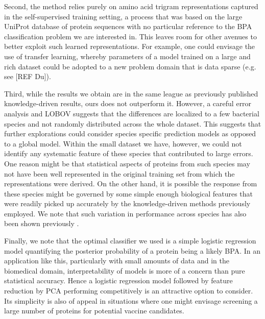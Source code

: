 \documentclass[10pt,journal,compsoc,twoside]{IEEEtran}
\begin{document}
Second, the method relies purely on amino acid trigram representations captured in the self-supervised training setting, a process that was based on the large UniProt database of protein sequences \cite{uniprot_2018} with no particular reference to the BPA classification problem we are interested in. This leaves room for other avenues to better exploit such learned representations. For example, one could envisage the use of transfer learning, whereby parameters of a model trained on a large and rich dataset could be adopted to a new problem domain that is data sparse (e.g. see [REF Du]). 

Third, while the results we obtain are in the same league as previously published knowledge-driven results, ours does not outperform it. However, a careful error analysis and LOBOV suggests that the differences are localized to a few bacterial species and not randomly distributed across the whole dataset. This suggests that further explorations could consider species specific prediction models as opposed to a global model. Within the small dataset we have, however, we could not identify any systematic feature of these species that contributed to large errors. One reason might be that statistical aspects of proteins from such species may not have been well represented in the original training set from which the representations were derived. On the other hand, it is possible the response from these species might be governed by some simple enough biological features that were readily picked up accurately by the knowledge-driven methods previously employed. We note that such variation in performance across species has also been shown previously \cite{heinson_2019}.

Finally, we note that the optimal classifier we used is a simple logistic regression model quantifying the posterior probability of a protein being a likely BPA. In an application like this, particularly with small amounts of data and in the biomedical domain, interpretability of models is more of a concern than pure statistical accuracy. Hence a logistic regression model followed by feature reduction by PCA performing competitively is an attractive option to consider. Its simplicity is also of appeal in situations where one might envisage screening a large number of proteins for potential vaccine candidates.    
\end{document}
